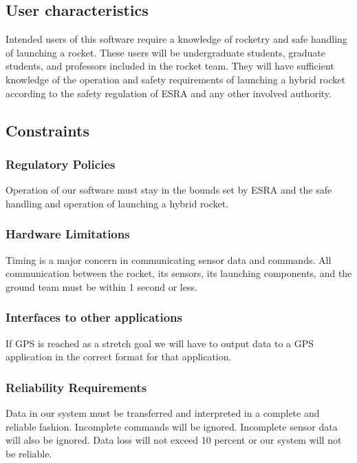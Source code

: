 \documentclass[10pt,draftclsnofoot,onecolumn,compsoc]{IEEEtran}
\begin{document}
\subsection{ User characteristics}
Intended users of this software require a knowledge of rocketry and safe handling of launching a rocket. These users will be undergraduate students, graduate students, and professors included in the rocket team. They will have sufficient knowledge of the operation and safety requirements of launching a hybrid rocket according to the safety regulation of ESRA and any other involved authority.

\subsection{Constraints}

\subsubsection{\bf  Regulatory Policies}Operation of our software must stay in the bounds set by ESRA and the safe handling and operation of launching a hybrid rocket.  

\subsubsection{\bf Hardware Limitations} Timing is a major concern in communicating sensor data and commands. All communication between the rocket, its sensors, its launching components, and the ground team must be within 1  second or less.

\subsubsection{\bf  Interfaces to other applications} If GPS is reached as a stretch goal we will have to output data to a GPS application in the correct format for that application.

\subsubsection{\bf Reliability Requirements} Data in our system must be transferred and interpreted in a complete and reliable fashion. Incomplete commands will be ignored. Incomplete sensor data will also be ignored. Data loss will not exceed 10 percent or our system will not be reliable.
\end{document}
